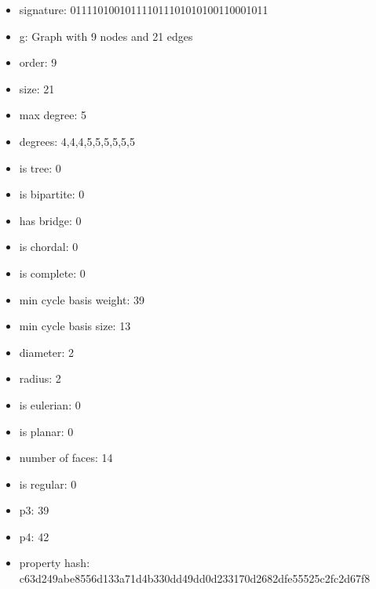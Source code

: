 \newpage
\begin{figure}
\end{figure}
\begin{itemize}
\item signature: 011110100101111011101010100110001011
\item g: Graph with 9 nodes and 21 edges
\item order: 9
\item size: 21
\item max degree: 5
\item degrees: 4,4,4,5,5,5,5,5,5
\item is tree: 0
\item is bipartite: 0
\item has bridge: 0
\item is chordal: 0
\item is complete: 0
\item min cycle basis weight: 39
\item min cycle basis size: 13
\item diameter: 2
\item radius: 2
\item is eulerian: 0
\item is planar: 0
\item number of faces: 14
\item is regular: 0
\item p3: 39
\item p4: 42
\item property hash: c63d249abe8556d133a71d4b330dd49dd0d233170d2682dfe55525c2fc2d67f8
\end{itemize}
